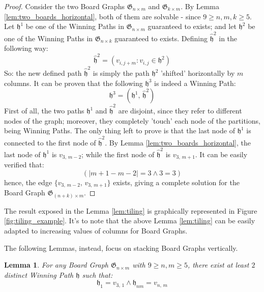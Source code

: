 \documentclass[conference]{IEEEtran}
\newtheorem{lemma}{Lemma}[section]
\begin{document}
\begin{proof}
    Consider the two Board Graphs $\mathfrak{G}_{n \times m}$ and $\mathfrak{G}_{k \times m}$.
    By Lemma \ref{lem:two_boards_horizontal}, both of them are solvable - since $9 \ge n, m, k \ge 5$.
    Let $\mathfrak{h}^1$ be one of the Winning Paths in $\mathfrak{G}_{n \times m}$ guaranteed to exists;
        and let $\mathfrak{h}^2$ be one of the Winning Paths in $\mathfrak{G}_{n \times k}$ guaranteed to exists.
    Defining $\hat{\mathfrak{h}}^2$ in the following way:
    $$
        \hat{\mathfrak{h}}^2 = (v_{i, j + m} : v_{i,j} \in \mathfrak{h}^2)
    $$
    So: the new defined path $\hat{\mathfrak{h}}^2$ is simply the path $\mathfrak{h}^2$ 'shifted' horizontally by $m$ columns.
        It can be proven that the following $\mathfrak{h}^3$ is indeed a Winning Path:
    $$
        \mathfrak{h}^3 = (\mathfrak{h}^1,\,\hat{\mathfrak{h}}^2)
    $$
    First of all, the two paths $\mathfrak{h}^1$ and $\hat{\mathfrak{h}}^2$ are disjoint, since they refer to different nodes of the graph; moreover, they completely 'touch' each node of the partitions, being Winning Paths.
    The only thing left to prove is that the last node of $\mathfrak{h}^1$ is connected to the first node of $\hat{\mathfrak{h}}^2$.
    By Lemma \ref{lem:two_boards_horizontal}, the last node of $\mathfrak{h}^1$ is $v_{3,\,m-2}$; while the first node of $\hat{\mathfrak{h}}^2$ is $v_{3,\,m+1}$.
    It can be easily verified that:
    $$
        (|m+1 - m-2| = 3 \land 3 = 3)
    $$
    hence, the edge $\{v_{3,\,m-2},\,v_{3,\,m+1}\}$ exists, giving a complete solution for the Board Graph $\mathfrak{G}_{(n + k) \times m}$.
\end{proof}

The result exposed in the Lemma \ref{lem:tiling} is graphically represented in Figure \ref{fig:tiling_example}.
It's to note that the above Lemma \ref{lem:tiling} can be easily adapted to increasing values of columns for Board Graphs.

The following Lemmas, instead, focus on stacking Board Graphs vertically.

\begin{lemma} \label{lem:two_boards_vertical}
    For any Board Graph $\mathfrak{G}_{n \times m}$ with $9 \ge n, m \ge 5$, there exist at least $2$ distinct Winning Path $\mathfrak{h}$ such that:
    $$
        \mathfrak{h}_1 = v_{3,\,1} \land \mathfrak{h}_{nm} = v_{n,\,m} 
    $$
\end{lemma}
\end{document}
